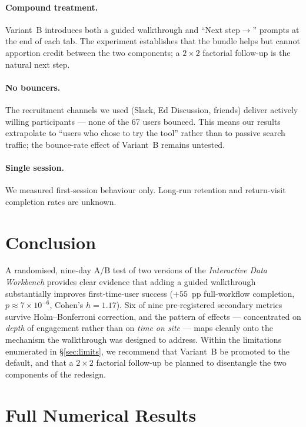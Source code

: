 \documentclass[11pt,a4paper]{article}
\begin{document}
\paragraph{Compound treatment.}
Variant~B introduces both a guided walkthrough and ``Next
step$\rightarrow$'' prompts at the end of each tab. The
experiment establishes that the bundle helps but cannot
apportion credit between the two components; a $2\times 2$
factorial follow-up is the natural next step.

\paragraph{No bouncers.}
The recruitment channels we used (Slack, Ed Discussion, friends)
deliver actively willing participants — none of the 67 users
bounced. This means our results extrapolate to ``users who
chose to try the tool'' rather than to passive search traffic;
the bounce-rate effect of Variant~B remains untested.

\paragraph{Single session.}
We measured first-session behaviour only. Long-run retention
and return-visit completion rates are unknown.

\section{Conclusion}

A randomised, nine-day A/B test of two versions of the
\textit{Interactive Data Workbench} provides clear evidence that
adding a guided walkthrough substantially improves first-time-user
success ($+55$~pp full-workflow completion, $p \approx
7\times10^{-6}$, Cohen's $h = 1.17$). Six of nine pre-registered
secondary metrics survive Holm--Bonferroni correction, and the
pattern of effects — concentrated on \emph{depth} of engagement
rather than on \emph{time on site} — maps cleanly onto the
mechanism the walkthrough was designed to address. Within the
limitations enumerated in \S\ref{sec:limits}, we recommend that
Variant~B be promoted to the default, and that a $2\times 2$
factorial follow-up be planned to disentangle the two components
of the redesign.

\appendix
\section{Full Numerical Results}
\label{app:numbers}
\end{document}

